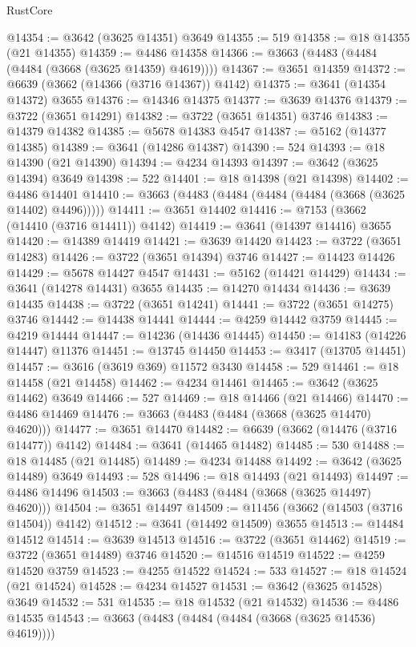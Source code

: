 \begin{lexlean}{RustCore}
\begin{coremodule}
@14354 := @3642 (@3625 @14351) @3649
@14355 := 519
@14358 := @18 @14355 (@21 @14355)
@14359 := @4486 @14358
@14366 := @3663 (@4483 (@4484 (@4484 (@3668 (@3625 @14359) @4619))))
@14367 := @3651 @14359
@14372 := @6639 (@3662 (@14366 (@3716 @14367)) @4142)
@14375 := @3641 (@14354 @14372) @3655
@14376 := @14346 @14375
@14377 := @3639 @14376
@14379 := @3722 (@3651 @14291)
@14382 := @3722 (@3651 @14351) @3746
@14383 := @14379 @14382
@14385 := @5678 @14383 @4547
@14387 := @5162 (@14377 @14385)
@14389 := @3641 (@14286 @14387)
@14390 := 524
@14393 := @18 @14390 (@21 @14390)
@14394 := @4234 @14393
@14397 := @3642 (@3625 @14394) @3649
@14398 := 522
@14401 := @18 @14398 (@21 @14398)
@14402 := @4486 @14401
@14410 := @3663 (@4483 (@4484 (@4484 (@4484 (@3668 (@3625 @14402) @4496)))))
@14411 := @3651 @14402
@14416 := @7153 (@3662 (@14410 (@3716 @14411)) @4142)
@14419 := @3641 (@14397 @14416) @3655
@14420 := @14389 @14419
@14421 := @3639 @14420
@14423 := @3722 (@3651 @14283)
@14426 := @3722 (@3651 @14394) @3746
@14427 := @14423 @14426
@14429 := @5678 @14427 @4547
@14431 := @5162 (@14421 @14429)
@14434 := @3641 (@14278 @14431) @3655
@14435 := @14270 @14434
@14436 := @3639 @14435
@14438 := @3722 (@3651 @14241)
@14441 := @3722 (@3651 @14275) @3746
@14442 := @14438 @14441
@14444 := @4259 @14442 @3759
@14445 := @4219 @14444
@14447 := @14236 (@14436 @14445)
@14450 := @14183 (@14226 @14447) @11376
@14451 := @13745 @14450
@14453 := @3417 (@13705 @14451)
@14457 := @3616 (@3619 @369) @11572 @3430
@14458 := 529
@14461 := @18 @14458 (@21 @14458)
@14462 := @4234 @14461
@14465 := @3642 (@3625 @14462) @3649
@14466 := 527
@14469 := @18 @14466 (@21 @14466)
@14470 := @4486 @14469
@14476 := @3663 (@4483 (@4484 (@3668 (@3625 @14470) @4620)))
@14477 := @3651 @14470
@14482 := @6639 (@3662 (@14476 (@3716 @14477)) @4142)
@14484 := @3641 (@14465 @14482)
@14485 := 530
@14488 := @18 @14485 (@21 @14485)
@14489 := @4234 @14488
@14492 := @3642 (@3625 @14489) @3649
@14493 := 528
@14496 := @18 @14493 (@21 @14493)
@14497 := @4486 @14496
@14503 := @3663 (@4483 (@4484 (@3668 (@3625 @14497) @4620)))
@14504 := @3651 @14497
@14509 := @11456 (@3662 (@14503 (@3716 @14504)) @4142)
@14512 := @3641 (@14492 @14509) @3655
@14513 := @14484 @14512
@14514 := @3639 @14513
@14516 := @3722 (@3651 @14462)
@14519 := @3722 (@3651 @14489) @3746
@14520 := @14516 @14519
@14522 := @4259 @14520 @3759
@14523 := @4255 @14522
@14524 := 533
@14527 := @18 @14524 (@21 @14524)
@14528 := @4234 @14527
@14531 := @3642 (@3625 @14528) @3649
@14532 := 531
@14535 := @18 @14532 (@21 @14532)
@14536 := @4486 @14535
@14543 := @3663 (@4483 (@4484 (@4484 (@3668 (@3625 @14536) @4619))))

\end{coremodule}
\end{lexlean}
